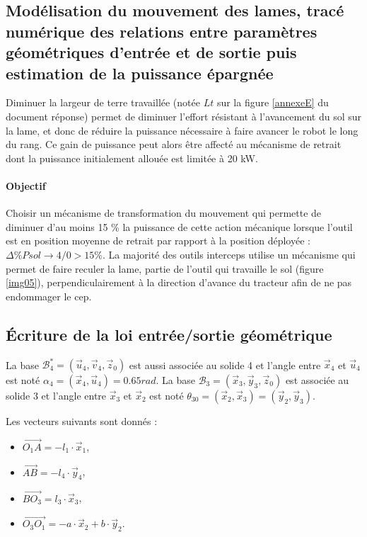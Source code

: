 \subsection{Modélisation du mouvement des lames, tracé numérique des relations entre paramètres géométriques d'entrée et de sortie puis estimation de la puissance épargnée}

Diminuer la largeur de terre travaillée (notée $Lt$ sur la figure \ref{annexeE} du document réponse) permet de diminuer l'effort résistant à l'avancement du sol sur la lame, et donc de réduire la puissance nécessaire à faire avancer le robot le long du rang. Ce gain de puissance peut alors être affecté au mécanisme de retrait dont la puissance initialement allouée est limitée à 20 kW.

\paragraph{Objectif}

Choisir un mécanisme de transformation du mouvement qui permette de diminuer d'au moins 15 \% la puissance de cette action mécanique lorsque l'outil est en position moyenne de retrait par rapport
à la position déployée : $\Delta\% P sol\rightarrow 4/0 > 15 \%$.
La majorité des outils interceps utilise un mécanisme qui permet de faire reculer la lame, partie de l'outil qui
travaille le sol (figure \ref{img05}), perpendiculairement à la direction d'avance du tracteur afin de ne pas endommager le
cep.

\subsection{Écriture de la loi entrée/sortie géométrique}

La base $\mathcal{B}^*_4=(\vec{u}_4,\vec{v}_4,\vec{z}_0)$ est aussi associée au solide 4 et l'angle entre $\vec{x}_4$ et $\vec{u}_4$ est noté $\alpha_4=(\vec{x}_4,\vec{u}_4)=0.65rad$. La base $\mathcal{B}_3=(\vec{x}_3,\vec{y}_3,\vec{z}_0)$ est associée au solide 3 et l'angle entre $\vec{x}_3$ et $\vec{x}_2$ est noté $\theta_{30}=(\vec{x}_2,\vec{x}_3)=(\vec{y}_2,\vec{y}_3)$.

Les vecteurs suivants sont donnés :
\begin{itemize}
 \item $\overrightarrow{O_1A}=-l_1\cdot\vec{x}_1$,
 \item $\overrightarrow{AB}=-l_4\cdot\vec{y}_4$,
 \item $\overrightarrow{BO_3}=l_3\cdot\vec{x}_3$,
 \item $\overrightarrow{O_3O_1}=-a\cdot\vec{x}_2+b\cdot\vec{y}_2$.
\end{itemize}

